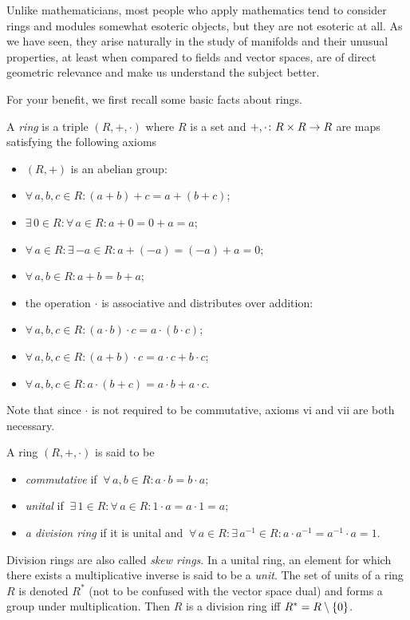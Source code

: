 Unlike mathematicians, most people who apply mathematics tend to consider rings and modules somewhat esoteric objects, but they are not esoteric at all. As we have seen, they arise naturally in the study of manifolds and their unusual properties, at least when compared to fields and vector spaces, are of direct geometric relevance and make us understand the subject better.

For your benefit, we first recall some basic facts about rings.

\bd
A \emph{ring} is a triple $(R,+,\cdot)$ where $R$ is a set and $+,\cdot\colon R\times R\to R$ are maps satisfying the following axioms
\begin{itemize}
\item $(R,+)$ is an abelian group:
\ben[label=\roman*)]
\item $\forall \, a,b,c \in R : (a+b)+c=a+(b+c)$;
\item $\exists \, 0 \in R : \forall \, a \in R : a+0=0+a=a$;
\item $\forall \, a \in R : \exists \, {-a} \in R : a+(-a)=(-a)+a=0$;
\item $\forall \, a,b \in R : a+b=b+a$;
\een
\item the operation $\cdot$ is associative and distributes over addition:
\ben[label=\roman*),start=5]
\item $\forall \, a,b,c \in R : (a\cdot b)\cdot c=a\cdot (b\cdot c)$;
\item $\forall \, a,b,c \in R : (a+ b)\cdot c=a\cdot c + b\cdot c$;
\item $\forall \, a,b,c \in R : a \cdot (b+c)=a\cdot b + a\cdot c$.
\een
\end{itemize}
Note that since $\cdot$ is not required to be commutative, axioms vi and vii are both necessary.
\ed

\bd 
A ring $(R,+,\cdot)$ is said to be
\begin{itemize}
\item \emph{commutative} if $\ \forall \, a,b\in R : a\cdot b = b \cdot a$;
\item \emph{unital} if $\ \exists\, 1\in R : \forall \, a\in R : 1\cdot a = a \cdot 1 = a$;
\item \emph{a division ring} if it is unital and $\ \forall\, a \in R : \exists \, a^{-1}\in R:a\cdot a^{-1}=a^{-1}\cdot a = 1$.
\end{itemize}
\ed

Division rings are also called \emph{skew rings}. In a unital ring, an element for which there exists a multiplicative inverse is said to be a \emph{unit}. The set of units of a ring $R$ is denoted $R^*$ (not to be confused with the vector space dual) and forms a group under multiplication. Then $R$ is a division ring iff $R^*=R\setminus\{0\}$.

